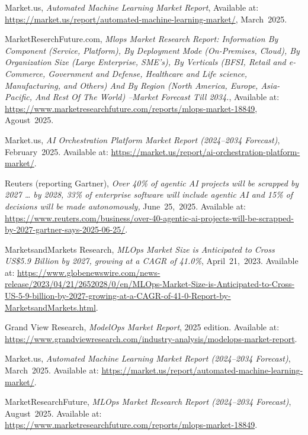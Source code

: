 \documentclass[11pt, a4paper, oneside]{article}
\begin{document}
\newpage
\begin{thebibliography}{99}
    Market.us, \textit{Automated Machine Learning Market Report}, Available at: \url{https://market.us/report/automated-machine-learning-market/}, March~2025.
    
    MarketReserchFuture.com, \textit{Mlops Market Research Report: Information By Component (Service, Platform), By Deployment Mode (On-Premises, Cloud), By Organization Size (Large Enterprise, SME's), By Verticals (BFSI, Retail and e-Commerce, Government and Defense, Healthcare and Life science, Manufacturing, and Others) And By Region (North America, Europe, Asia-Pacific, And Rest Of The World) –Market Forecast Till 2034.}, Available at: \url{https://www.marketresearchfuture.com/reports/mlops-market-18849}, Agoust~2025.
    
    Market.us, \textit{AI Orchestration Platform Market Report (2024--2034 Forecast)}, February~2025.  
    Available at: \url{https://market.us/report/ai-orchestration-platform-market/}.

    Reuters (reporting Gartner), \textit{Over 40\% of agentic AI projects will be scrapped by 2027 … by 2028, 33\% of enterprise software will include agentic AI and 15\% of decisions will be made autonomously,} June~25,~2025.  
    Available at: \url{https://www.reuters.com/business/over-40-agentic-ai-projects-will-be-scrapped-by-2027-gartner-says-2025-06-25/}.

    MarketsandMarkets Research, \textit{MLOps Market Size is Anticipated to Cross US\$5.9 Billion by 2027, growing at a CAGR of 41.0\%}, April~21,~2023.  
    Available at: \url{https://www.globenewswire.com/news-release/2023/04/21/2652028/0/en/MLOps-Market-Size-is-Anticipated-to-Cross-US-5-9-billion-by-2027-growing-at-a-CAGR-of-41-0-Report-by-MarketsandMarkets.html}.

    Grand View Research, \textit{ModelOps Market Report}, 2025 edition.  
    Available at: \url{https://www.grandviewresearch.com/industry-analysis/modelops-market-report}.

    Market.us, \textit{Automated Machine Learning Market Report (2024--2034 Forecast)}, March~2025.  
    Available at: \url{https://market.us/report/automated-machine-learning-market/}.

    MarketResearchFuture, \textit{MLOps Market Research Report (2024--2034 Forecast)}, August~2025.  
    Available at: \url{https://www.marketresearchfuture.com/reports/mlops-market-18849}.


\end{thebibliography}
\end{document}
